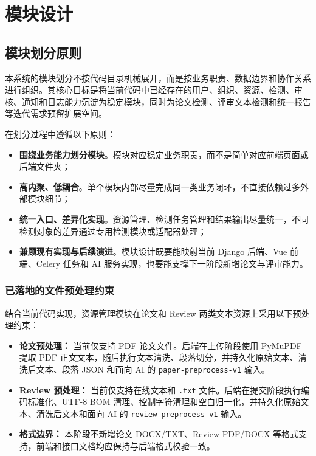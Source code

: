 \section{模块设计}

\subsection{模块划分原则}
本系统的模块划分不按代码目录机械展开，而是按业务职责、数据边界和协作关系进行组织。其核心目标是将当前代码中已经存在的用户、组织、资源、检测、审核、通知和日志能力沉淀为稳定模块，同时为论文检测、评审文本检测和统一报告等迭代需求预留扩展空间。

在划分过程中遵循以下原则：
\begin{itemize}[leftmargin=2em]
    \item \textbf{围绕业务能力划分模块}。模块对应稳定业务职责，而不是简单对应前端页面或后端文件夹；
    \item \textbf{高内聚、低耦合}。单个模块内部尽量完成同一类业务闭环，不直接依赖过多外部模块细节；
    \item \textbf{统一入口、差异化实现}。资源管理、检测任务管理和结果输出尽量统一，不同检测对象的差异通过专用检测模块或适配器处理；
    \item \textbf{兼顾现有实现与后续演进}。模块设计既要能映射当前 Django 后端、Vue 前端、Celery 任务和 AI 服务实现，也要能支撑下一阶段新增论文与评审能力。
\end{itemize}

\subsubsection{已落地的文件预处理约束}

结合当前代码实现，资源管理模块在论文和 Review 两类文本资源上采用以下预处理约束：

\begin{itemize}[leftmargin=2em]
    \item \textbf{论文预处理：} 当前仅支持 PDF 论文文件。后端在上传阶段使用 PyMuPDF 提取 PDF 正文文本，随后执行文本清洗、段落切分，并持久化原始文本、清洗后文本、段落 JSON 和面向 AI 的 \texttt{paper-preprocess-v1} 输入。
    \item \textbf{Review 预处理：} 当前仅支持在线文本和 \texttt{.txt} 文件。后端在提交阶段执行编码标准化、UTF-8 BOM 清理、控制字符清理和空白归一化，并持久化原始文本、清洗后文本和面向 AI 的 \texttt{review-preprocess-v1} 输入。
    \item \textbf{格式边界：} 本阶段不新增论文 DOCX/TXT、Review PDF/DOCX 等格式支持，前端和接口文档均应保持与后端格式校验一致。
\end{itemize}

